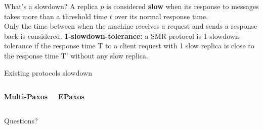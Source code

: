 \documentclass[10pt]{beamer}
\begin{document}
\begin{frame}[fragile]{What's a slowdown?}
A replica $p$ is considered \textbf{slow} when its response to messages takes more than a threshold time $t$ over its normal response time.\\
\smallbreak
Only the time between when the machine receives a request  and sends a response back is considered.
\smallbreak
\textbf{1-slowdown-tolerance:} a  SMR protocol is 1-slowdown-tolerance if the response time T to a client request with 1 slow replica is close to the response time T' without any slow replica.
\end{frame}

\begin{frame}[fragile]{Existing protocols slowdown}
  \begin{columns}[T,onlytextwidth]
    \begin{center}
        \textbf{Multi-Paxos}
    \end{center}
    \begin{center}
        \textbf{EPaxos}
    \end{center}
  \end{columns}

\end{frame}


{
\begin{frame}[standout]
  Questions?
\end{frame}
}
\end{document}
